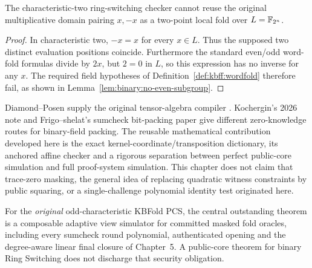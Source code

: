 \begin{proposition}\label{prop:zkrs:cross-field}
The characteristic-two ring-switching checker
cannot reuse the original multiplicative
domain pairing $x,-x$ as a two-point
local fold over $L=\mathbb{F}_{2^n}$.
\end{proposition}
\begin{proof}
In characteristic two, $-x=x$
for every $x\in L$.
Thus the supposed two distinct
evaluation positions coincide.
Furthermore the standard
even/odd word-fold formulas
divide by $2x$, but $2=0$
in $L$, so this expression
has no inverse for any $x$.
The required field hypotheses
of Definition~\ref{def:kbff:wordfold}
therefore fail, as shown in
Lemma~\ref{lem:binary:no-even-subgroup}.
\end{proof}

\begin{remark}
Diamond--Posen supply the original
tensor-algebra compiler
\cite{DiamondPosen2024}.
Kochergin's 2026 note
\cite{Kochergin2026}
and Frigo--shelat's
sumcheck bit-packing paper
\cite{FrigoShelat2026} give
different zero-knowledge routes
for binary-field packing.
The reusable mathematical contribution
developed here is the exact
kernel-coordinate/transposition
dictionary, its anchored affine
checker and a rigorous separation
between perfect public-core
simulation and full proof-system
simulation. This chapter does not
claim that trace-zero masking,
the general idea of replacing
quadratic witness constraints by
public squaring, or a
single-challenge polynomial identity
test originated here.
\end{remark}

\begin{remark}
For the \emph{original} odd-characteristic
KBFold PCS, the central outstanding
theorem is a composable adaptive
view simulator for committed masked
fold oracles, including every
sumcheck round polynomial,
authenticated opening and the
degree-aware linear final closure
of Chapter~5.
A public-core theorem for binary
Ring Switching does not discharge
that security obligation.
\end{remark}
